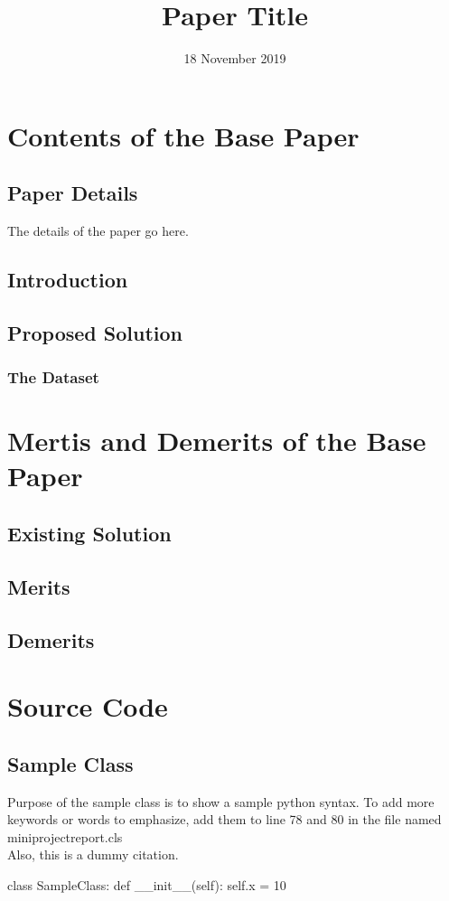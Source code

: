 \documentclass{miniprojectreport}
\title{Paper Title}
\date{18 November 2019}
\begin{document}
	\makeminireportfirstpage
	\bonafide
	\acknowledgement{\lipsum[1]}
	\newpage
	\tableofcontents
	\newpage
	\setcounter{page}{1}
	\chapter{Contents of the Base Paper}
		\setcounter{chapter}{1}
		\section{Paper Details}
		The details of the paper go here.
		\section{Introduction}
		\lipsum[3]
		\section{Proposed Solution}
		\lipsum[4]
		\subsection{The Dataset}
		\lipsum[5]
	\chapter{Mertis and Demerits of the Base Paper}
		\section{Existing Solution}
		\lipsum[6]
		\section{Merits}
		\lipsum[7]
		\section{Demerits}
		\lipsum[8]
	\chapter{Source Code}
	\section{Sample Class}
	Purpose of the sample class is to show a sample python syntax. To add more keywords or words to emphasize, add them to line 78 and 80 in the file named miniprojectreport.cls\\Also, this\cite{7457930} is a dummy citation.\\
\begin{python}
class SampleClass:
    def __init__(self):
        self.x = 10	
\end{python}
	
\end{document}
